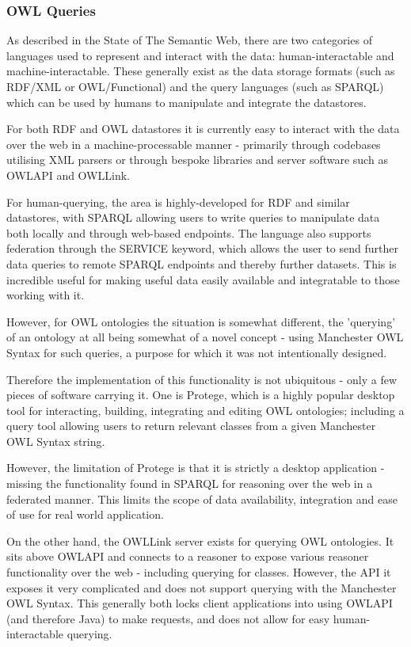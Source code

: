 \documentclass{article}
\begin{document}
\subsubsection{OWL Queries}

As described in the State of The Semantic Web, there are two categories of
languages used to represent and interact with the data: human-interactable and
machine-interactable. These generally exist as the data storage formats (such as
RDF/XML or OWL/Functional) and the query languages (such as SPARQL) which can be 
used by humans to manipulate and integrate the datastores.

For both RDF and OWL datastores it is currently easy to interact with the data
over the web in a machine-processable manner - primarily through codebases
utilising XML parsers or through bespoke libraries and server software such as 
OWLAPI and OWLLink.

For human-querying, the area is highly-developed for RDF and similar datastores, 
with SPARQL allowing users to write queries to manipulate data both locally and
through web-based endpoints. The language also supports federation through the
SERVICE keyword, which allows the user to send further data queries to remote
SPARQL endpoints and thereby further datasets. This is incredible useful for
making useful data easily available and integratable to those working with it.

However, for OWL ontologies the situation is somewhat different, the 'querying'
of an ontology at all being somewhat of a novel concept - using Manchester OWL
Syntax for such queries, a purpose for which it was not intentionally designed.

Therefore the implementation of this functionality is not ubiquitous - only a
few pieces of software carrying it. One is Protege, which is a highly popular
desktop tool for interacting, building, integrating and editing OWL ontologies;
including a query tool allowing users to return relevant classes from a given
Manchester OWL Syntax string. 

However, the limitation of Protege is that it is strictly a desktop application
- missing the functionality found in SPARQL for reasoning over the web in a
federated manner. This limits the scope of data availability, integration and
ease of use for real world application. 

On the other hand, the OWLLink server exists for querying OWL ontologies. It
sits above OWLAPI and connects to a reasoner to expose various reasoner
functionality over the web - including querying for classes. However, the API it
exposes it very complicated and does not support querying with the Manchester
OWL Syntax. This generally both locks client applications into using OWLAPI (and
therefore Java) to make requests, and does not allow for easy human-interactable 
querying. 
\end{document}
